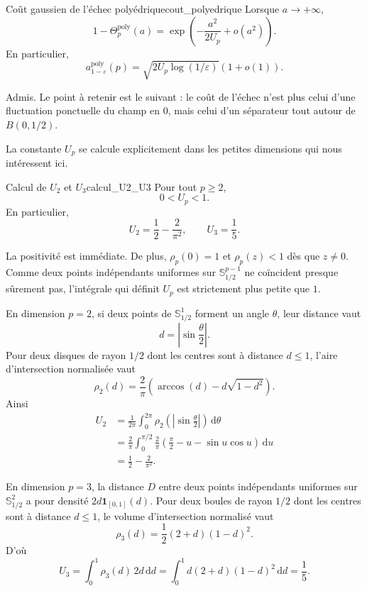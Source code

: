 \begin{Theoreme}{Coût gaussien de l'échec polyédrique}{cout_polyedrique}
Lorsque $a\to+\infty$,
\[
    1-\Theta_p^{\mathrm{poly}}(a)
    =
    \exp\left(
        -\frac{a^2}{2U_p}+o(a^2)
    \right).
\]
En particulier,
\[
    a^{\mathrm{poly}}_{1-\varepsilon}(p)
    =
    \sqrt{2U_p\log(1/\varepsilon)}(1+o(1)).
\]
\end{Theoreme}

\begin{Preuve}
Admis. Le point à retenir est le suivant : le coût de l'échec n'est plus celui d'une fluctuation ponctuelle du champ en $0$, mais celui d'un séparateur tout autour de $B(0,1/2)$.
\end{Preuve}

La constante $U_p$ se calcule explicitement dans les petites dimensions qui nous intéressent ici.

\begin{Fait}{Calcul de $U_2$ et $U_3$}{calcul_U2_U3}
Pour tout $p\ge2$,
\[
    0<U_p<1.
\]
En particulier,
\[
    U_2=\frac12-\frac2{\pi^2},
    \qquad
    U_3=\frac15.
\]
\end{Fait}

\begin{Preuve}
La positivité est immédiate. De plus, $\rho_p(0)=1$ et $\rho_p(z)<1$ dès que $z\ne0$. Comme deux points indépendants uniformes sur $\mathbb S^{p-1}_{1/2}$ ne coïncident presque sûrement pas, l'intégrale qui définit $U_p$ est strictement plus petite que $1$.

En dimension $p=2$, si deux points de $\mathbb S^1_{1/2}$ forment un angle $\theta$, leur distance vaut
\[
    d=\left|\sin\frac\theta2\right|.
\]
Pour deux disques de rayon $1/2$ dont les centres sont à distance $d\le1$, l'aire d'intersection normalisée vaut
\[
    \rho_2(d)
    =
    \frac2\pi
    \left(
        \arccos(d)-d\sqrt{1-d^2}
    \right).
\]
Ainsi
\[
\begin{split}
    U_2
    &=
    \frac1{2\pi}\int_0^{2\pi}
    \rho_2\left(\left|\sin\frac\theta2\right|\right)
    \,\mathrm d\theta  \\
    &=
    \frac2\pi\int_0^{\pi/2}
    \frac2\pi
    \left(
        \frac\pi2-u-\sin u\cos u
    \right)\,\mathrm du  \\
    &=
    \frac12-\frac2{\pi^2}.
\end{split}
\]

En dimension $p=3$, la distance $D$ entre deux points indépendants uniformes sur $\mathbb S^2_{1/2}$ a pour densité $2d\mathbf 1_{[0,1]}(d)$. Pour deux boules de rayon $1/2$ dont les centres sont à distance $d\le1$, le volume d'intersection normalisé vaut
\[
    \rho_3(d)
    =
    \frac12(2+d)(1-d)^2.
\]
D'où
\[
    U_3
    =
    \int_0^1 \rho_3(d)\,2d\,\mathrm dd
    =
    \int_0^1 d(2+d)(1-d)^2\,\mathrm dd
    =
    \frac15.
\]
\end{Preuve}

